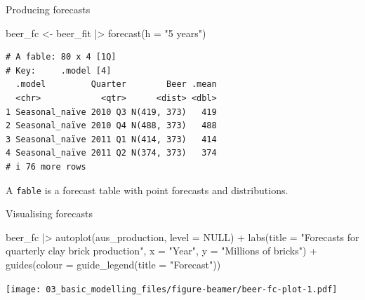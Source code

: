 \documentclass[
  14pt,
  ignorenonframetext,
  aspectratio=169,
]{beamer}
\newenvironment{Shaded}{\begin{snugshade}}{\end{snugshade}}
\newcommand{\AttributeTok}[1]{\textcolor[rgb]{0.77,0.63,0.00}{#1}}
\newcommand{\ConstantTok}[1]{\textcolor[rgb]{0.00,0.00,0.00}{#1}}
\newcommand{\FunctionTok}[1]{\textcolor[rgb]{0.00,0.00,0.00}{#1}}
\newcommand{\NormalTok}[1]{\textcolor[rgb]{0.00,0.00,0.00}{#1}}
\newcommand{\OtherTok}[1]{\textcolor[rgb]{0.56,0.35,0.01}{#1}}
\newcommand{\SpecialCharTok}[1]{\textcolor[rgb]{0.00,0.00,0.00}{#1}}
\newcommand{\StringTok}[1]{\textcolor[rgb]{0.31,0.60,0.02}{#1}}
\renewenvironment{Shaded}{\vspace*{0.15cm}\color{black}\fontsize{10}{10}\sf\begin{snugshade}\color{black}}{\end{snugshade}}
\begin{document}
\begin{frame}[fragile]{Producing forecasts}
\protect\hypertarget{producing-forecasts-1}{}
\fontsize{10}{13}\sf

\begin{Shaded}
\begin{Highlighting}[]
\NormalTok{beer\_fc }\OtherTok{\textless{}{-}}\NormalTok{ beer\_fit }\SpecialCharTok{|\textgreater{}}
  \FunctionTok{forecast}\NormalTok{(}\AttributeTok{h =} \StringTok{"5 years"}\NormalTok{)}
\end{Highlighting}
\end{Shaded}

\begin{verbatim}
# A fable: 80 x 4 [1Q]
# Key:     .model [4]
  .model         Quarter        Beer .mean
  <chr>            <qtr>      <dist> <dbl>
1 Seasonal_naïve 2010 Q3 N(419, 373)   419
2 Seasonal_naïve 2010 Q4 N(488, 373)   488
3 Seasonal_naïve 2011 Q1 N(414, 373)   414
4 Seasonal_naïve 2011 Q2 N(374, 373)   374
# i 76 more rows
\end{verbatim}

\vspace*{0.2cm}\begin{alertblock}{}
A \texttt{fable} is a forecast table with point forecasts and distributions.
\end{alertblock}
\end{frame}

\begin{frame}[fragile]{Visualising forecasts}
\protect\hypertarget{visualising-forecasts}{}
\footnotesize

\begin{Shaded}
\begin{Highlighting}[]
\NormalTok{beer\_fc }\SpecialCharTok{|\textgreater{}}
  \FunctionTok{autoplot}\NormalTok{(aus\_production, }\AttributeTok{level =} \ConstantTok{NULL}\NormalTok{) }\SpecialCharTok{+}
  \FunctionTok{labs}\NormalTok{(}\AttributeTok{title =} \StringTok{"Forecasts for quarterly clay brick production"}\NormalTok{,}
       \AttributeTok{x =} \StringTok{"Year"}\NormalTok{, }\AttributeTok{y =} \StringTok{"Millions of bricks"}\NormalTok{) }\SpecialCharTok{+}
  \FunctionTok{guides}\NormalTok{(}\AttributeTok{colour =} \FunctionTok{guide\_legend}\NormalTok{(}\AttributeTok{title =} \StringTok{"Forecast"}\NormalTok{))}
\end{Highlighting}
\end{Shaded}

\texttt{[image: 03\_basic\_modelling\_files/figure-beamer/beer-fc-plot-1.pdf]}
\end{frame}
\end{document}

